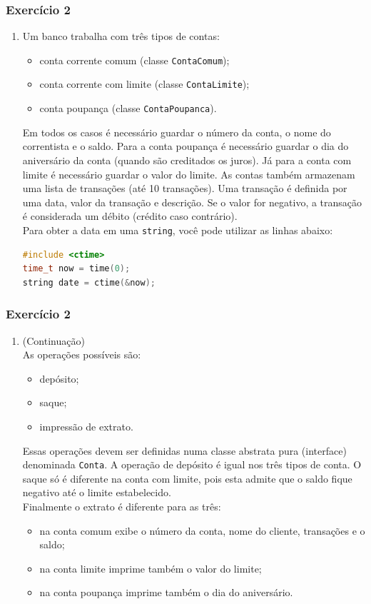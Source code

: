 \documentclass[aspectratio=169]{beamer}
\newcommand\setItemnumber[1]{\setcounter{enumi}{\numexpr#1-1\relax}}
\begin{document}
\begin{frame}[fragile]\frametitle{Exercício 2}
\begin{enumerate}
	\setItemnumber{2}
	\item Um banco trabalha com três tipos de contas:
	\begin{itemize}
		\item conta corrente comum (classe \texttt{ContaComum});
		\item conta corrente com limite (classe \texttt{ContaLimite});
		\item conta poupança (classe \texttt{ContaPoupanca}).
	\end{itemize}
	Em todos os casos é necessário guardar o número da conta, o nome do correntista e o saldo. Para a conta poupança é necessário guardar o dia do aniversário da conta (quando são creditados os juros). Já para a conta com limite é necessário guardar o valor do limite. As contas também armazenam uma lista de transações (até 10 transações). Uma transação é definida por uma data, valor da transação e descrição. Se o valor for negativo, a transação é considerada um débito (crédito caso contrário).\\
	Para obter a data em uma \texttt{string}, você pode utilizar as linhas abaixo:
\begin{lstlisting}[language=C++,basicstyle=\ttfamily\scriptsize]
#include <ctime>
time_t now = time(0);
string date = ctime(&now);
\end{lstlisting}
\end{enumerate}
\end{frame}

\begin{frame}[fragile]\frametitle{Exercício 2}
\begin{enumerate}
	\setItemnumber{2}
	\item (Continuação)\\
	As operações possíveis são:
	\begin{itemize}
		\item depósito;
		\item saque;
		\item impressão de extrato.
	\end{itemize}
	Essas operações devem ser definidas numa classe abstrata pura (interface) denominada \texttt{Conta}. A operação de depósito é igual nos três tipos de conta. O saque só é diferente na conta com limite, pois esta admite que o saldo fique negativo até o limite estabelecido.\\
	Finalmente o extrato é diferente para as três:
	\begin{itemize}
		\item na conta comum exibe o número da conta, nome do cliente, transações e o saldo;
		\item na conta limite imprime também o valor do limite;
		\item na conta poupança imprime também o dia do aniversário.
	\end{itemize}
\end{enumerate}
\end{frame}
\end{document}
